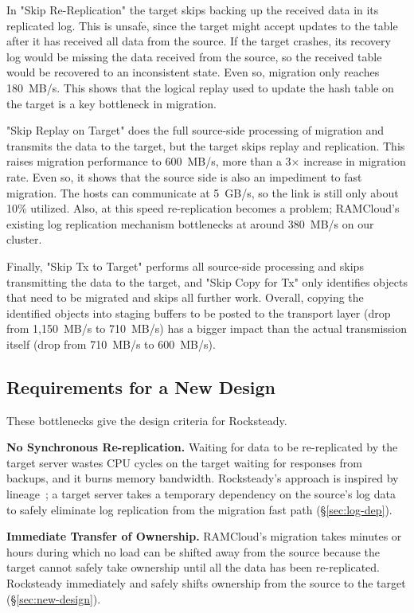 In "Skip Re-Replication" the target skips backing up the
received data in its replicated log. This is unsafe, since the target might accept
updates to the table after it has received all data from the source. If the
target crashes, its recovery log would be missing the data received from the
source, so the received table would be recovered to an inconsistent state.
Even so, migration only reaches 180~MB/s. This shows that the
logical replay used to update the hash table on the target is a key
bottleneck in migration.

"Skip Replay on Target" does the full source-side processing of migration and
transmits the data to the target, but the target skips replay and replication.
This raises migration performance
to 600~MB/s, more than a 3$\times$ increase in migration
rate. Even so, it shows that the source side is also an impediment to fast
migration. The hosts can communicate at 5~GB/s, so the link is still only
about 10\% utilized. Also, at this speed re-replication becomes a
problem; RAMCloud's existing log replication mechanism bottlenecks at around
380~MB/s on our cluster.

Finally, "Skip Tx to Target" performs all source-side processing and skips
transmitting the data to the target, and "Skip Copy for Tx" only identifies
objects that need to be migrated and skips all further work. Overall, copying
the identified objects into staging buffers to be posted to the
transport layer (drop
from 1,150~MB/s to 710~MB/s) has a bigger impact than the actual transmission
itself (drop from 710~MB/s to 600~MB/s).

\subsection{Requirements for a New Design}

These bottlenecks give the design criteria for Rocksteady.

\noindent
\textbf{No Synchronous Re-replication.} Waiting for data to be re-replicated by
the target server wastes CPU cycles on the target waiting for responses from
backups, and it burns memory bandwidth. Rocksteady's approach is inspired by
lineage~\cite{spark}; a target server takes a temporary dependency on the
source's log data to safely eliminate log replication from the migration fast
path (\S\ref{sec:log-dep}).

\noindent
\textbf{Immediate Transfer of Ownership.} RAMCloud's migration takes minutes
or hours during which no load can be shifted away from the source
because the target cannot safely take ownership until all
the data has been re-replicated.  Rocksteady immediately and safely shifts
ownership from the source to the target (\S\ref{sec:new-design}).

